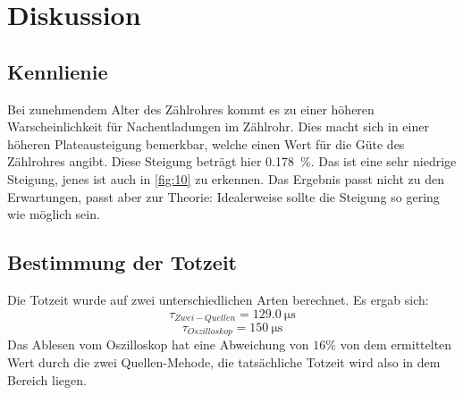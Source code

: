\section{Diskussion}
\label{sec:Diskussion}

\subsection{Kennlienie}
Bei zunehmendem Alter des Zählrohres kommt es zu einer höheren Warscheinlichkeit 
für Nachentladungen im Zählrohr. Dies macht sich in einer höheren Plateausteigung 
bemerkbar, welche einen Wert für die Güte des Zählrohres angibt.
Diese Steigung beträgt hier \qty{0.178}{\%}. Das ist eine sehr niedrige Steigung,
jenes ist auch in \autoref{fig:10} zu erkennen. Das Ergebnis passt nicht zu 
den Erwartungen, passt aber zur Theorie: Idealerweise sollte die Steigung so 
gering wie möglich sein.

\subsection{Bestimmung der Totzeit}
Die Totzeit wurde auf zwei unterschiedlichen Arten berechnet.
Es ergab sich: 
\begin{equation}
    \tau_{Zwei-Quellen} = \qty{129.0}{\micro\second} 
\end{equation}
\begin{equation}
    \tau_{Oszilloskop} = \qty{150}{\micro\second} 
\end{equation}
Das Ablesen vom Oszilloskop hat eine Abweichung von $16 \%$ von dem 
ermittelten Wert durch die zwei Quellen-Mehode, die tatsächliche 
Totzeit wird also in dem Bereich liegen.